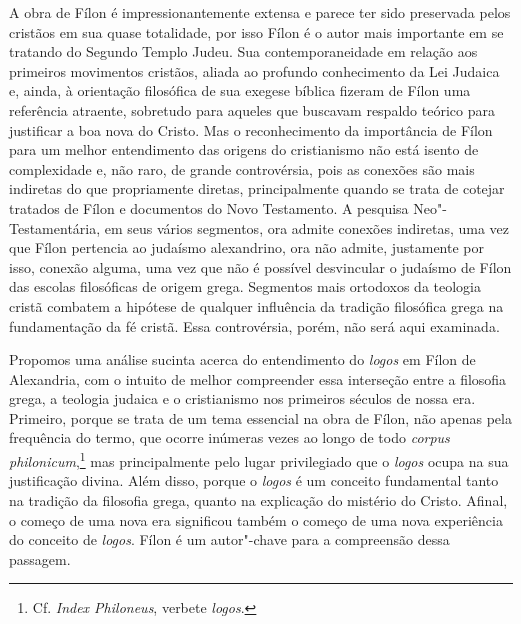 A obra de Fílon é impressionantemente extensa e parece ter sido
preservada pelos cristãos em sua quase totalidade, por isso Fílon
é o autor mais importante em se tratando do Segundo Templo
Judeu. Sua contemporaneidade em relação aos primeiros movimentos
cristãos, aliada ao profundo conhecimento da Lei Judaica e,
ainda, à orientação filosófica de sua exegese bíblica fizeram de
Fílon uma referência atraente, sobretudo para aqueles que
buscavam respaldo teórico para justificar a boa nova do Cristo.
Mas o reconhecimento da importância de Fílon para um melhor
entendimento das origens do cristianismo não está isento de
complexidade e, não raro, de grande controvérsia, pois as
conexões são mais indiretas do que propriamente diretas,
principalmente quando se trata de cotejar tratados de Fílon e
documentos do {Novo Testamento}. A pesquisa
Neo"-Testamentária, em seus vários segmentos, ora admite conexões
indiretas, uma vez que Fílon pertencia ao judaísmo alexandrino,
ora não admite, justamente por isso, conexão alguma, uma vez que
não é possível desvincular o judaísmo de Fílon das escolas
filosóficas de origem grega. Segmentos mais ortodoxos da
teologia cristã combatem a hipótese de qualquer influência da
tradição filosófica grega na fundamentação da fé cristã. Essa
controvérsia, porém, não será aqui examinada. 

Propomos uma análise sucinta acerca do entendimento do
\emph{logos} em Fílon de Alexandria, com o intuito de melhor
compreender essa interseção entre a filosofia grega, a teologia
judaica e o cristianismo nos primeiros séculos de nossa era.
Primeiro, porque se trata de um tema essencial na obra de Fílon,
não apenas pela frequência do termo, que ocorre inúmeras vezes
ao longo de todo \emph{corpus philonicum},\footnote{ Cf.
\emph{Index Philoneus}, verbete \emph{logos}.} mas
principalmente pelo lugar privilegiado que o \emph{logos}
ocupa na sua justificação divina. Além disso, porque o
\emph{logos} é um conceito fundamental tanto na tradição da
filosofia grega, quanto na explicação do mistério do Cristo.
Afinal, o começo de uma nova era significou também o começo de
uma nova experiência do conceito de \emph{logos}. Fílon é um
autor"-chave para a compreensão dessa passagem.

